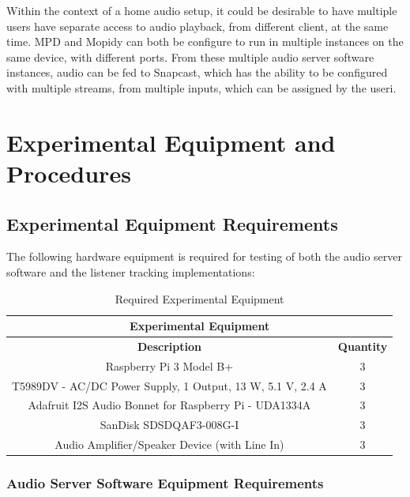 \documentclass[11pt,a4paper,headinclude=false,footinclude=false]{scrreprt}
\begin{document}
Within the context of a home audio setup, it could be desirable to have
multiple users have separate access to audio playback, from different
client, at the same time. MPD and Mopidy can both be configure to run in
multiple instances on the same device, with different ports. From these
multiple audio server software instances, audio can be fed to Snapcast,
which has the ability to be configured with multiple streams, from
multiple inputs, which can be assigned by the useri\cite{snapcastZones}.

\chapter{Experimental Equipment and
Procedures}\label{experimental-equipment-and-procedures}

\section{Experimental Equipment
Requirements}\label{experimental-equipment-requirements}

The following hardware equipment is required for testing of both the
audio server software and the listener tracking implementations:

\begin{table}[H]
\centering
    \begin{tabular}{||c|c||}
    \hline
    \multicolumn{2}{|c|}{\textbf{Experimental Equipment}} \\
    \hline\hline
    \textbf{Description} & \textbf{Quantity} \\
    \hline\hline
    Raspberry Pi 3 Model B+ & 3 \\
    \hline
    T5989DV - AC/DC Power Supply, 1 Output, 13 W, 5.1 V, 2.4 A & 3 \\
    \hline
    Adafruit I2S Audio Bonnet for Raspberry Pi - UDA1334A & 3 \\
    \hline
    SanDisk SDSDQAF3-008G-I & 3 \\
    \hline
    Audio Amplifier/Speaker Device (with Line In) & 3 \\
    \hline
    \end{tabular}
    \caption{Required Experimental Equipment}
    \label{ExperimentalEquip}
\end{table}

\subsection{Audio Server Software Equipment
Requirements}\label{audio-server-software-equipment-requirements}
\end{document}
